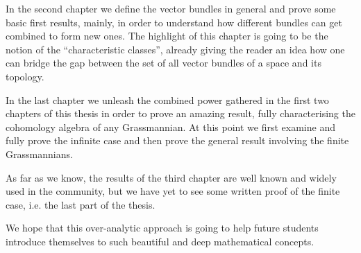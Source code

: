 In the second chapter we define the vector bundles in general and prove some basic first results, mainly, in order to understand how different bundles can get combined to form new ones. The highlight of this chapter is going to be the notion of the ``characteristic classes'', already giving the reader an idea how one can bridge the gap between the set of all vector bundles of a space and its topology.

In the last chapter we unleash the combined power gathered in the first two chapters of this thesis in order to prove an amazing result, fully characterising the cohomology algebra of any Grassmannian. At this point we first examine and fully prove the infinite case and then prove the general result involving the finite Grassmannians.

As far as we know, the results of the third chapter are well known and widely used in the community, but we have yet to see some written proof of the finite case, i.e. the last part of the thesis.

We hope that this over-analytic approach is going to help future students introduce themselves to such beautiful and deep mathematical concepts.
